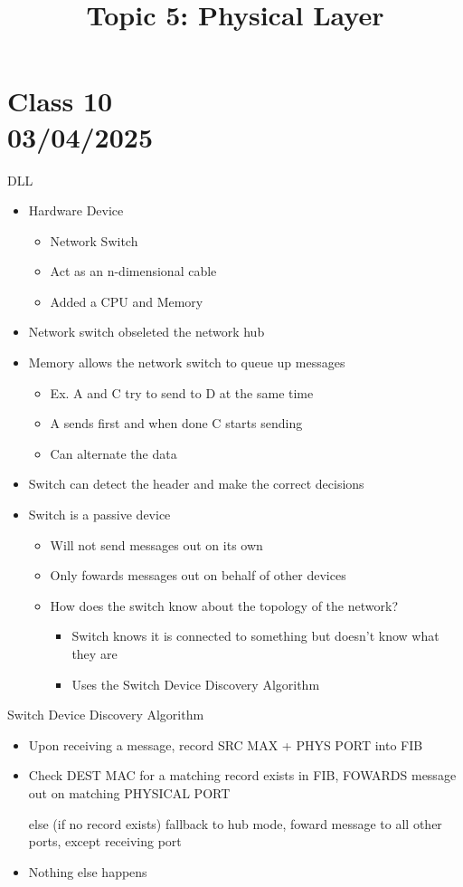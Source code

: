 \documentclass{article}
\title{Topic 5: Physical Layer}
\date{}
\begin{document}
\section*{Class 10 \\ 03/04/2025}\label{sec:Class 10}
DLL
\begin{itemize}
    \item  Hardware Device
    \begin{itemize}
        \item Network Switch
        \item Act as an n-dimensional cable
        \item Added a CPU and Memory
    \end{itemize}
    \item Network switch obseleted the network hub
    \item Memory allows the network switch to queue up messages
    \begin{itemize}
        \item Ex. A and C try to send to D at the same time
        \item A sends first and when done C starts sending
        \item Can alternate the data 
    \end{itemize}
    \item Switch can detect the header and make the correct decisions
    \item Switch is a passive device 
    \begin{itemize}
        \item Will not send messages out on its own
        \item Only fowards messages out on behalf of other devices
        \item How does the switch know about the topology of the network?
        \begin{itemize}
            \item Switch knows it is connected to something but doesn't know what they are 
            \item Uses the Switch Device Discovery Algorithm
        \end{itemize}
    \end{itemize}
\end{itemize}
Switch Device Discovery Algorithm
\begin{itemize}
    \item Upon receiving a message, record {SRC MAX + PHYS PORT} into FIB 
    \item Check {DEST MAC} for a matching record exists in FIB, FOWARDS message out on matching {PHYSICAL PORT} 
    
    else (if no record exists) fallback to hub mode, foward message to all other ports, except receiving port
    \item Nothing else happens
\end{itemize}
\end{document}
